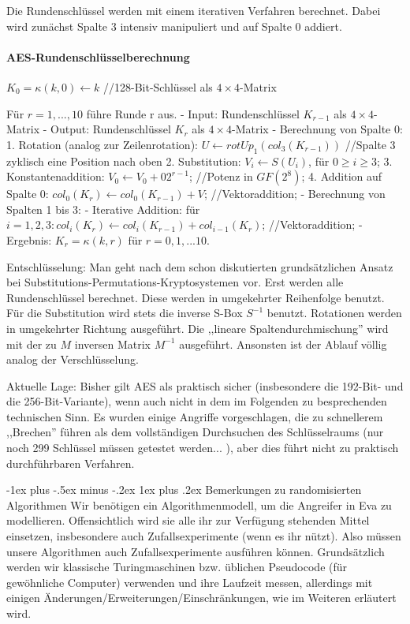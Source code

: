 \documentclass[a4paper]{article}
\makeatletter
\renewcommand{\subsubsection}{\@startsection{subsubsection}{3}{0mm}%
 {-1ex plus -.5ex minus -.2ex}%
 {1ex plus .2ex}%
 {\normalfont\small\bfseries}}
\makeatother
\begin{document}
\begin{multicols}{3}
    Die Rundenschlüssel werden mit einem iterativen Verfahren berechnet. Dabei wird zunächst Spalte 3 intensiv manipuliert und auf Spalte 0 addiert.

    \paragraph{AES-Rundenschlüsselberechnung}
    $K_0 =\kappa (k,0)\leftarrow k$ //128-Bit-Schlüssel als $4\times 4$-Matrix

    Für $r= 1,..., 10$ führe Runde r aus.
    - Input: Rundenschlüssel $K_{r-1}$ als $4\times 4$-Matrix
    - Output: Rundenschlüssel $K_r$ als $4\times 4$-Matrix
    - Berechnung von Spalte 0:
    1. Rotation (analog zur Zeilenrotation): $U\leftarrow rotUp_1(col_3(K_{r-1}))$ //Spalte 3 zyklisch eine Position nach oben
    2. Substitution: $V_i\leftarrow S(U_i)$, für $0\geq i\geq 3$;
    3. Konstantenaddition: $V_0\leftarrow V_0+02^{r-1}$; //Potenz in $GF(2^8)$;
    4. Addition auf Spalte 0: $col_0(K_r)\leftarrow col_0(K_{r-1})+V$; //Vektoraddition;
    - Berechnung von Spalten 1 bis 3:
    - Iterative Addition: für $i=1,2,3: col_i(K_r)\leftarrow col_i(K_{r-1})+col_{i-1}(K_r)$; //Vektoraddition;
    - Ergebnis: $K_r=\kappa (k,r)$ für $r=0,1,...10$.

    Entschlüsselung:
    Man geht nach dem schon diskutierten grundsätzlichen Ansatz bei Substitutions-Permutations-Kryptosystemen vor. Erst werden alle Rundenschlüssel berechnet. Diese werden in umgekehrter Reihenfolge benutzt. Für die Substitution wird stets die inverse S-Box $S^{-1}$ benutzt. Rotationen werden in umgekehrter Richtung ausgeführt. Die ,,lineare Spaltendurchmischung'' wird mit der zu $M$ inversen Matrix $M^{-1}$ ausgeführt. Ansonsten ist der Ablauf völlig analog der Verschlüsselung.

    Aktuelle Lage:
    Bisher gilt AES als praktisch sicher (insbesondere die 192-Bit- und die 256-Bit-Variante), wenn auch nicht in dem im Folgenden zu besprechenden technischen Sinn. Es wurden einige Angriffe vorgeschlagen, die zu schnellerem ,,Brechen'' führen als dem vollständigen Durchsuchen des Schlüsselraums (nur noch 299 Schlüssel müssen getestet werden... ), aber dies führt nicht zu praktisch durchführbaren Verfahren.

    \subsubsection{Bemerkungen zu randomisierten Algorithmen}
    Wir benötigen ein Algorithmenmodell, um die Angreifer in Eva zu modellieren. Offensichtlich wird sie alle ihr zur Verfügung stehenden Mittel einsetzen, insbesondere auch Zufallsexperimente (wenn es ihr nützt). Also müssen unsere Algorithmen auch Zufallsexperimente ausführen können. Grundsätzlich werden wir klassische Turingmaschinen bzw. üblichen Pseudocode (für gewöhnliche Computer) verwenden und ihre Laufzeit messen, allerdings mit einigen Änderungen/Erweiterungen/Einschränkungen, wie im Weiteren erläutert wird.


\end{multicols}
\end{document}
